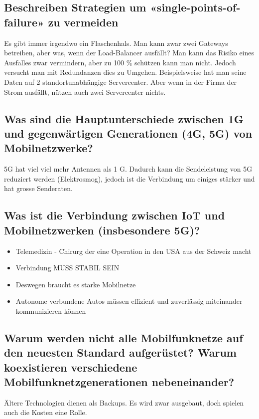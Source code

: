 \subsection*{Beschreiben Strategien um «single-points-of-failure» zu vermeiden}
Es gibt immer irgendwo ein Flaschenhals. Man kann zwar zwei Gateways betreiben, aber was, wenn der Load-Balancer ausfällt? Man kann das Risiko eines Ausfalles zwar vermindern, aber zu 100 \% schützen kann man nicht. Jedoch versucht man mit Redundanzen dies zu Umgehen. Beispielsweise hat man seine Daten auf 2 standortunabhängige Servercenter. Aber wenn in der Firma der Strom ausfällt, nützen auch zwei Servercenter nichts.

\subsection*{Was sind die Hauptunterschiede zwischen 1G und gegenwärtigen Generationen (4G, 5G) von Mobilnetzwerke?}
5G hat viel viel mehr Antennen als 1 G. Dadurch kann die Sendeleistung von 5G reduziert werden (Elektrosmog), jedoch ist die Verbindung um einiges stärker und hat grosse Senderaten.

\subsection*{Was ist die Verbindung zwischen IoT und Mobilnetzwerken (insbesondere 5G)?}
\begin{itemize}
    \item Telemedizin - Chirurg der eine Operation in den USA aus der Schweiz macht
    \item Verbindung MUSS STABIL SEIN
    \item Deswegen braucht es starke Mobilnetze
    \item Autonome verbundene Autos müssen effizient und zuverlässig miteinander kommunizieren können
\end{itemize}


\subsection*{Warum werden nicht alle Mobilfunknetze auf den neuesten Standard aufgerüstet? Warum koexistieren verschiedene Mobilfunknetzgenerationen nebeneinander?}
Ältere Technologien dienen als Backups. Es wird zwar ausgebaut, doch spielen auch die Kosten eine Rolle.

